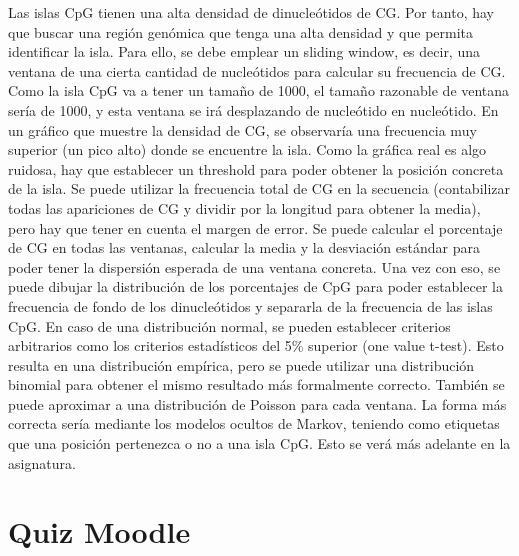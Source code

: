 Las islas CpG tienen una alta densidad de dinucleótidos de CG. Por tanto, hay que buscar una región genómica que tenga una alta densidad y que permita identificar la isla. Para ello, se debe emplear un sliding window, es decir, una ventana de una cierta cantidad de nucleótidos para calcular su frecuencia de CG. Como la isla CpG va a tener un tamaño de 1000, el tamaño razonable de ventana sería de 1000, y esta ventana se irá desplazando de nucleótido en nucleótido. En un gráfico que muestre la densidad de CG, se observaría una frecuencia muy superior (un pico alto) donde se encuentre la isla. Como la gráfica real es algo ruidosa, hay que establecer un threshold para poder obtener la posición concreta de la isla. Se puede utilizar la frecuencia total de CG en la secuencia (contabilizar todas las apariciones de CG y dividir por la longitud para obtener la media), pero hay que tener en cuenta el margen de error. Se puede calcular el porcentaje de CG en todas las ventanas, calcular la media y la desviación estándar para poder tener la dispersión esperada de una ventana concreta. Una vez con eso, se puede dibujar la distribución de los porcentajes de CpG para poder establecer la frecuencia de fondo de los dinucleótidos y separarla de la frecuencia de las islas CpG. En caso de una distribución normal, se pueden establecer criterios arbitrarios como los criterios estadísticos del 5\% superior (one value t-test). Esto resulta en una distribución empírica, pero se puede utilizar una distribución binomial para obtener el mismo resultado más formalmente correcto. También se puede aproximar a una distribución de Poisson para cada ventana. La forma más correcta sería mediante los modelos ocultos de Markov, teniendo como etiquetas que una posición pertenezca o no a una isla CpG. Esto se verá más adelante en la asignatura. 

\section{Quiz Moodle}
